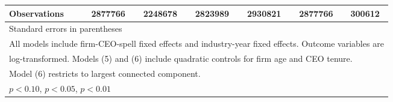 \begin{table}[htbp]
\begin{tabular}{l*{6}{c}}
\midrule
Observations        &     2877766         &     2248678         &     2823989         &     2930821         &     2877766         &      300612         \\
\bottomrule
\multicolumn{7}{l}{\footnotesize Standard errors in parentheses}\\
\multicolumn{7}{l}{\footnotesize All models include firm-CEO-spell fixed effects and industry-year fixed effects. Outcome variables are}\\
\multicolumn{7}{l}{\footnotesize log-transformed. Models (5) and (6) include quadratic controls for firm age and CEO tenure.}\\
\multicolumn{7}{l}{\footnotesize Model (6) restricts to largest connected component.}\\
\multicolumn{7}{l}{\footnotesize \sym{*} \(p<0.10\), \sym{**} \(p<0.05\), \sym{***} \(p<0.01\)}\\
\end{tabular}
\end{table}
